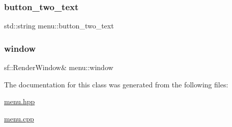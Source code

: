 \mbox{\label{classmenu_a027f3482fde6a4991ff4036e9e0472bd}} 
\subsubsection{\texorpdfstring{button\+\_\+two\+\_\+text}{button\_two\_text}}
{\footnotesize\ttfamily std\+::string menu\+::button\+\_\+two\+\_\+text\hspace{0.3cm}{\ttfamily [private]}}

\mbox{\label{classmenu_a27f2df7cf63febffe1c3c5a5e13ffb8d}} 
\subsubsection{\texorpdfstring{window}{window}}
{\footnotesize\ttfamily sf\+::\+Render\+Window\& menu\+::window\hspace{0.3cm}{\ttfamily [private]}}



The documentation for this class was generated from the following files\+:\begin{DoxyCompactItemize}
\item 
\hyperlink{menu_8hpp}{menu.\+hpp}\item 
\hyperlink{menu_8cpp}{menu.\+cpp}\end{DoxyCompactItemize}
